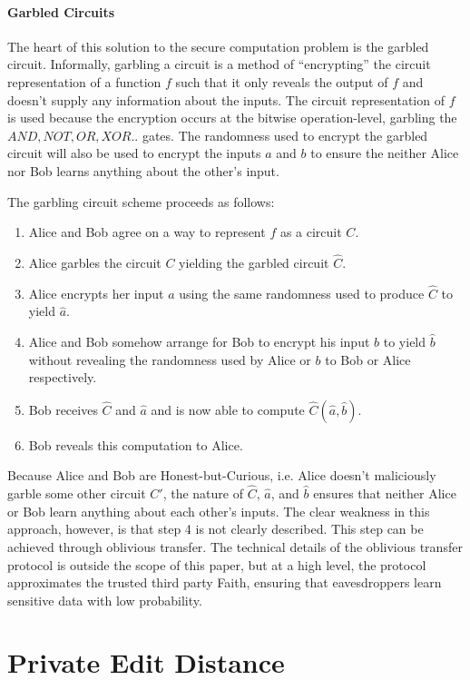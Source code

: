 \paragraph{Garbled Circuits}
The heart of this solution to the secure computation problem is the garbled circuit. Informally, garbling a circuit is a method of ``encrypting'' the circuit representation of a function $f$ such that it only reveals the output of $f$ and doesn't supply any information about the inputs. The circuit representation of $f$ is used because the encryption occurs at the bitwise operation-level, garbling the $AND, NOT, OR, XOR..$ gates. The randomness used to encrypt the garbled circuit will also be used to encrypt the inputs $a$ and $b$ to ensure the neither Alice nor Bob learns anything about the other's input.

The garbling circuit scheme proceeds as follows:
\begin{enumerate}
\item Alice and Bob agree on a way to represent $f$ as a circuit $C$.
\item Alice garbles the circuit $C$ yielding the garbled circuit $\hat{C}$.
\item Alice encrypts her input $a$ using the same randomness used to produce $\hat{C}$ to yield $\hat{a}$.
\item Alice and Bob somehow arrange for Bob to encrypt his input $b$ to yield $\hat{b}$ without revealing the randomness used by Alice or $b$ to Bob or Alice respectively.
\item Bob receives $\hat{C}$ and $\hat{a}$ and is now able to compute $\hat{C}(\hat{a}, \hat{b})$.
\item Bob reveals this computation to Alice.
\end{enumerate}
Because Alice and Bob are Honest-but-Curious, i.e. Alice doesn't maliciously garble some other circuit $C'$, the nature of $\hat{C}$, $\hat{a}$, and $\hat{b}$ ensures that neither Alice or Bob learn anything about each other's inputs. The clear weakness in this approach, however, is that step 4 is not clearly described. This step can be achieved through oblivious transfer. The technical details of the oblivious transfer protocol is outside the scope of this paper, but at a high level, the protocol approximates the trusted third party Faith, ensuring that eavesdroppers learn sensitive data with low probability.

\pagebreak
\section{Private Edit Distance}

